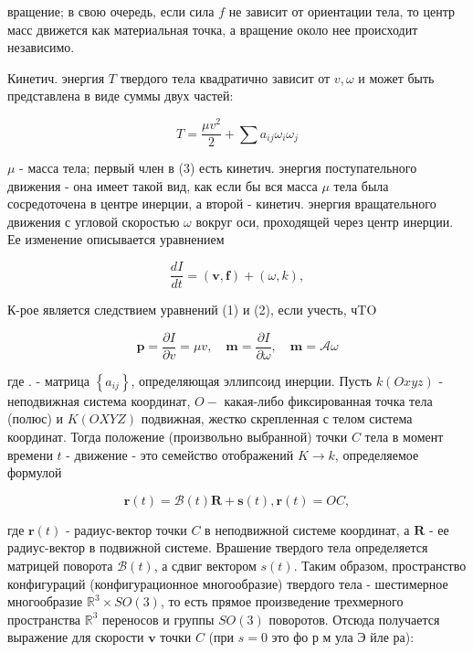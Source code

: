 \documentclass[10pt]{article}
\begin{document}
вращение; в свою очередь, если сила $f$ не зависит от ориентации тела, то центр масс движется как материальная точка, а вращение около нее происходит независимо.



Кинетич. энергия $T$ твердого тела квадратично зависит от $v, \omega$ и может быть представлена в виде суммы двух частей:



\[

T=\frac{\mu v^{2}}{2}+\sum a_{i j} \omega_{i} \omega_{j}

\]



$\mu$ - масса тела; первый член в (3) есть кинетич. энергия поступательного движения - она имеет такой вид, как если бы вся масса $\mu$ тела была сосредоточена в центре инерции, а второй - кинетич. энергия вращательного движения с угловой скоростью $\omega$ вокруг оси, проходящей через центр инерции. Ее изменение описывается уравнением



\[

\frac{d I}{d t}=(\boldsymbol{v}, \boldsymbol{f})+(\omega, k),

\]



К-рое является следствием уравнений (1) и (2), если учесть, чTO



\[

\boldsymbol{p}=\frac{\partial I}{\partial v}=\mu v, \quad \boldsymbol{m}=\frac{\partial I}{\partial \omega}, \quad \boldsymbol{m}=\mathscr{A} \omega

\]



где . - матрица $\left\{a_{i j}\right\}$, определяющая эллипсоид инерции. Пусть $k(O x y z)$ - неподвижная система координат, $O-$ какая-либо фиксированная точка тела (полюс) и $K(O X Y Z)$ подвижная, жестко скрепленная с телом система координат. Тогда положение (произвольно выбранной) точки $C$ тела в момент времени $t$ - движение - это семейство отображений $K \rightarrow k$, определяемое формулой



\[

\boldsymbol{r}(t)=\mathscr{B}(t) \boldsymbol{R}+\boldsymbol{s}(t), \boldsymbol{r}(t)=O C,

\]



где $\boldsymbol{r}(t)$ - радиус-вектор точки $C$ в неподвижной системе координат, а $\boldsymbol{R}$ - ее радиус-вектор в подвижной системе. Врашение твердого тела определяется матрицей поворота $\mathscr{B}(t)$, а сдвиг вектором $s(t)$. Таким образом, пространство конфигураций (конфигурационное многообразие) твердого тела - шестимерное многообразие $\mathbb{R}^{3} \times S O(3)$, то есть прямое произведение трехмерного пространства $\mathbb{R}^{3}$ переносов и группы $S O(3)$ поворотов. Отсюда получается выражение для скорости $\boldsymbol{v}$ точки $C$ (при $s=0$ это фо р м ула Э йле ра):
\end{document}
